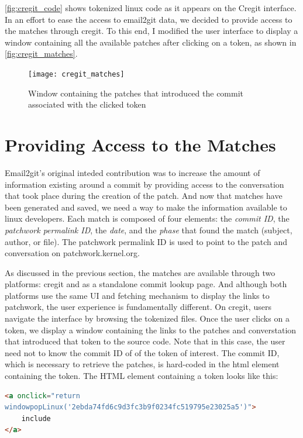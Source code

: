 \autoref{fig:cregit_code} shows tokenized linux code as it appears on the Cregit interface. In an effort to ease the access to email2git data, we decided to provide access to the matches through cregit. To this end, I modified the user interface to display a window containing all the available patches after clicking on a token, as shown in \autoref{fig:cregit_matches}. 

\begin{figure}[htb]
\centering
\texttt{[image: cregit\_matches]}
\caption{Window containing the patches that introduced the commit associated with the clicked token}
\label{fig:cregit_matches}
\end{figure}




\section{Providing Access to the Matches}

Email2git's original inteded contribution was to increase the amount of information existing around a commit by providing access to the conversation that took place during the creation of the patch. And now that matches have been generated and saved, we need a way to make the information available to linux developers. Each match is composed of four elements: the \textit{commit ID}, the \textit{patchwork permalink ID}, the \textit{date}, and the \textit{phase} that found the match (subject, author, or file). The patchwork permalink ID is used to point to the patch and conversation on patchwork.kernel.org.

As discussed in the previous section, the matches are available through two platforms: cregit and as a standalone commit lookup page. And although both platforms use the same UI and fetching mechanism to display the links to patchwork, the user experience is fundamentally different. On cregit, users navigate the interface by browsing the tokenized files. Once the user clicks on a token, we display a window containing the links to the patches and converstation that introduced that token to the source code. Note that in this case, the user need not to know the commit ID of of the token of interest. The commit ID, which is necessary to retrieve the patches, is hard-coded in the html element containing the token. The HTML element containing a token looks like this:

\begin{lstlisting}[language=HTML]
<a onclick="return 
windowpopLinux('2ebda74fd6c9d3fc3b9f0234fc519795e23025a5')">
	include
</a>
\end{lstlisting}

